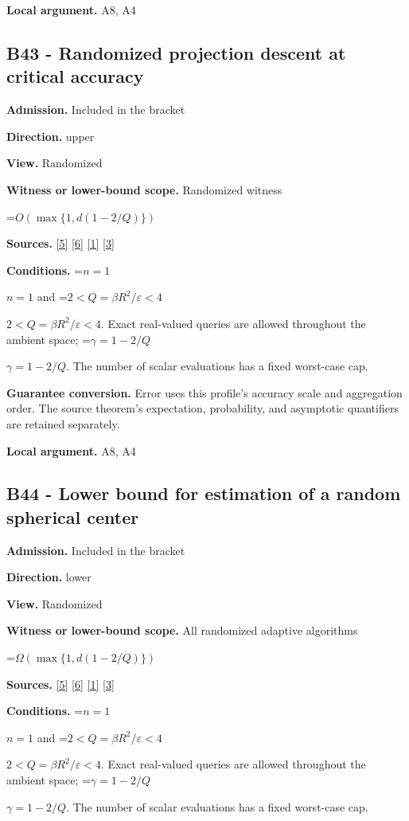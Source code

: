 \documentclass[10pt,a4paper]{article}
\newcommand{\AtlasMath}[1]{\par\begingroup\centering\setbox0=\hbox{$\displaystyle #1$}\ifdim\wd0>1.4\linewidth\typeout{ATLAS WIDE FORMULA: \the\wd0}\fi\ifdim\wd0>\linewidth\resizebox{\linewidth}{!}{\box0}\else\box0\fi\par\endgroup}
\newcommand{\AtlasInlineMath}[1]{\begingroup\setbox0=\hbox{$#1$}\ifdim\wd0>.4\linewidth\endgroup\AtlasMath{#1}\else\endgroup$#1$\fi}
\begin{document}
\textbf{Local argument.} A8, A4

\subsection{B43 - Randomized projection descent at critical accuracy}
\textbf{Admission.} Included in the bracket

\textbf{Direction.} upper

\textbf{View.} Randomized

\textbf{Witness or lower-bound scope.} Randomized witness

\AtlasMath{O(\max\{1,d(1-2/Q)\})}
\textbf{Sources.} \href{https://arxiv.org/html/2607.16558v2}{[5]} \href{https://www.mathnet.ru/php/archive.phtml?jrnid=mzm&option_lang=eng&paperid=1697&wshow=paper}{[6]} \href{https://arxiv.org/html/2610.00345v1}{[1]} \href{https://arxiv.org/abs/2109.08858}{[3]}

\textbf{Conditions.} \AtlasInlineMath{n=1} and \AtlasInlineMath{2<Q=\beta R^2/\varepsilon<4}. Exact real-valued queries are allowed throughout the ambient space; \AtlasInlineMath{\gamma=1-2/Q}. The number of scalar evaluations has a fixed worst-case cap.

\textbf{Guarantee conversion.} Error uses this profile's accuracy scale and aggregation order. The source theorem's expectation, probability, and asymptotic quantifiers are retained separately.

\textbf{Local argument.} A8, A4

\subsection{B44 - Lower bound for estimation of a random spherical center}
\textbf{Admission.} Included in the bracket

\textbf{Direction.} lower

\textbf{View.} Randomized

\textbf{Witness or lower-bound scope.} All randomized adaptive algorithms

\AtlasMath{\Omega(\max\{1,d(1-2/Q)\})}
\textbf{Sources.} \href{https://arxiv.org/html/2607.16558v2}{[5]} \href{https://www.mathnet.ru/php/archive.phtml?jrnid=mzm&option_lang=eng&paperid=1697&wshow=paper}{[6]} \href{https://arxiv.org/html/2610.00345v1}{[1]} \href{https://arxiv.org/abs/2109.08858}{[3]}

\textbf{Conditions.} \AtlasInlineMath{n=1} and \AtlasInlineMath{2<Q=\beta R^2/\varepsilon<4}. Exact real-valued queries are allowed throughout the ambient space; \AtlasInlineMath{\gamma=1-2/Q}. The number of scalar evaluations has a fixed worst-case cap.
\end{document}
